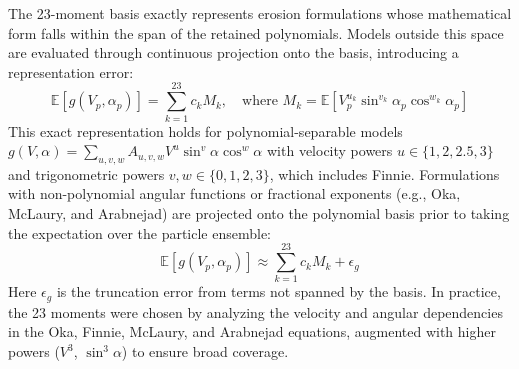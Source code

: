 \documentclass{article}
\begin{document}
The 23-moment basis exactly represents erosion formulations whose mathematical form falls within the span of the retained polynomials. Models outside this space are evaluated through continuous projection onto the basis, introducing a representation error:
\begin{equation}
    \mathbb{E}[g(V_p, \alpha_p)] = \sum_{k=1}^{23} c_k M_k, \quad \text{where } M_k = \mathbb{E}[V_p^{u_k} \sin^{v_k}\alpha_p \cos^{w_k}\alpha_p]
    \label{eq:exact_representation}
\end{equation}
This exact representation holds for polynomial-separable models $g(V,\alpha) = \sum_{u,v,w} A_{u,v,w} V^u \sin^v\alpha \cos^w\alpha$ with velocity powers $u \in \{1, 2, 2.5, 3\}$ and trigonometric powers $v,w \in \{0,1,2,3\}$, which includes Finnie. Formulations with non-polynomial angular functions or fractional exponents (e.g., Oka, McLaury, and Arabnejad) are projected onto the polynomial basis prior to taking the expectation over the particle ensemble:
\begin{equation}
    \mathbb{E}[g(V_p, \alpha_p)] \approx \sum_{k=1}^{23} c_k M_k + \epsilon_g
    \label{eq:approx_representation}
\end{equation}
Here $\epsilon_g$ is the truncation error from terms not spanned by the basis. In practice, the 23 moments were chosen by analyzing the velocity and angular dependencies in the Oka, Finnie, McLaury, and Arabnejad equations, augmented with higher powers ($V^3$, $\sin^3\alpha$) to ensure broad coverage.
\end{document}
